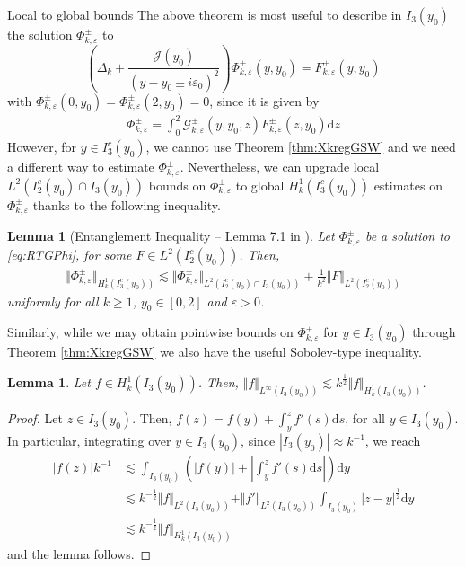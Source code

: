\documentclass[11pt,reqno]{amsproc}
\makeatletter
\renewcommand\subsubsection{\@startsection{subsubsection}{3}%
\normalparindent{.5\linespacing\@plus.7\linespacing}{-.5em}
{\normalfont\bfseries}}
\newtheorem{lemma}[proposition]{Lemma}
\theoremstyle{definition}
\numberwithin{equation}{section}
\newcommand{\G}{{\mathcal{G}}}
\newcommand{\cJ}{{\mathcal{J}}}
\newcommand{\D}{{\Delta}}
\renewcommand{\d}{\mathrm{d}}
\newcommand{\ep}{\varepsilon}
\makeatother
\begin{document}
\subsubsection{Local to global bounds}
The above theorem is most useful to describe in $I_3(y_0)$ the solution $\Phi_{k,\ep}^\pm$ to 
\begin{equation}\label{eq:RTGPhi}
\left(\D_k+\frac{\cJ(y_0)}{(y-y_0\pm i\ep_0)^2}\right){\Phi}_{k,\ep}^\pm(y,y_0) = F_{k,\ep}^\pm(y,y_0)
\end{equation}
with $\Phi_{k,\ep}^\pm(0,y_0) = \Phi_{k,\ep}^\pm(2,y_0) = 0$, since it is given by
\begin{align*}
{\Phi}_{k,\ep}^\pm = \int_0^2 \G_{k,\ep}^\pm(y,y_0,z) F_{k,\ep}^\pm(z,y_0) \d z
\end{align*}
However, for $y\in I_3^c(y_0)$, we cannot use Theorem \ref{thm:XkregGSW} and we need a different way to estimate $\Phi_{k,\ep}^\pm$. Nevertheless, we can upgrade local $L^2(I_2^c(y_0)\cap I_3(y_0))$ bounds on $\Phi_{k,\ep}^\pm$ to global $H_k^1(I_3^c(y_0))$ estimates on $\Phi_{k,\ep}^\pm$ thanks to the following inequality.

\begin{lemma}[Entanglement Inequality -- Lemma 7.1 in \cite{CZN25chan}]\label{lemma:entanglementRTG}
Let $\Phi_{k,\ep}^\pm$ be a solution to \eqref{eq:RTGPhi}, for some $F\in L^2(I_2^c(y_0))$. Then,
\begin{align*}
 \Vert \Phi_{k,\ep}^\pm \Vert_{H_k^1(I_3^c(y_0))} \lesssim \Vert \Phi_{k,\ep}^\pm \Vert_{L^2(I_2^c(y_0)\cap I_3(y_0))} + \frac{1}{k^2}\Vert F \Vert_{L^2(I_2^c(y_0))}
\end{align*}
uniformly for all $k\geq 1$, $y_0\in[0,2]$ and $\ep>0$. 
\end{lemma}

Similarly, while we may obtain pointwise bounds on $\Phi_{k,\ep}^\pm$ for $y\in I_3(y_0)$ through Theorem \ref{thm:XkregGSW} we also have the useful Sobolev-type inequality.

\begin{lemma}\label{lemma:LinfH1bound}
Let $f\in H^1_k(I_3(y_0))$. Then, $\Vert f \Vert_{L^\infty(I_3(y_0))} \lesssim k^{\frac12}\Vert f \Vert_{H_k^1(I_3(y_0))}$.
\end{lemma}

\begin{proof}
Let $z\in I_3(y_0)$. Then, $f(z) = f(y) + \int_y^z f'(s) \d s$, for all $y\in I_3(y_0)$. In particular, integrating over $y\in I_3(y_0)$, since $|I_3(y_0)|\approx k^{-1}$, we reach
\begin{align*}
|f(z)| k^{-1} &\lesssim \int_{I_3(y_0)} \left( |f(y)| + \left| \int_y^z f'(s) \d s \right| \right) \d y \\
&\lesssim k^{-\frac12}\Vert f\Vert_{L^2(I_3(y_0))} + \Vert f'\Vert_{L^2(I_3(y_0))}  \int_{I_3(y_0)} |z-y|^\frac12 \d y \\
&\lesssim k^{-\frac12} \Vert f \Vert_{H_k^1(I_3(y_0))}
\end{align*}
and the lemma follows.
\end{proof}
\end{document}
